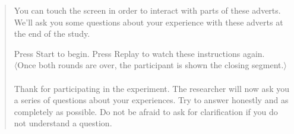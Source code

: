 \begin{quotation}
	You can touch the screen in order to interact with parts of these adverts. We'll ask you some questions about your experience with these adverts at the end of the study.

	Press Start to begin. Press Replay to watch these instructions again.\\
	
	\noindent $\langle$Once both rounds are over, the participant is shown the closing segment.$\rangle$\\

	\\

	Thank for participating in the experiment. The researcher will now ask you a series of questions about your experiences. Try to answer honestly and as completely as possible. Do not be afraid to ask for clarification if you do not understand a question.\\

	\noindent [END]

\end{quotation}